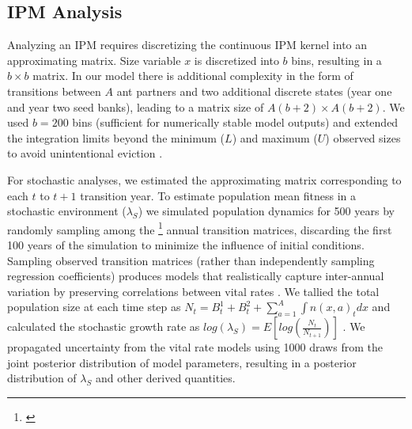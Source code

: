 \documentclass[11pt]{article}
\newcommand{\tom}[2]{{\color{red}{#1}}\footnote{\textit{\color{red}{#2}}}}
\begin{document}
\subsection*{IPM Analysis}
Analyzing an IPM requires discretizing the continuous IPM kernel into an approximating matrix. 
Size variable $x$ is discretized into $b$ bins, resulting in a $b \times b$ matrix.
In our model there is additional complexity in the form of transitions between $A$ ant partners and two additional discrete states (year one and year two seed banks), leading to a matrix size of $A(b+2) \times A(b+2)$.
We used $b = 200$ bins (sufficient for numerically stable model outputs) and extended the integration limits beyond the minimum ($L$) and maximum ($U$) observed sizes to avoid unintentional eviction \cite{Williams2012}. 

For stochastic analyses, we estimated the approximating matrix corresponding to each $t$ to $t+1$ transition year. 
To estimate population mean fitness in a stochastic environment ($\lambda_{S}$) we simulated population dynamics for 500 years by randomly sampling among the \tom{19}{Is this right? The number of transition matrices should be one fewer than then number of years, but I don't remember what happens with 2020.} annual transition matrices, discarding the first 100 years of the simulation to minimize the influence of initial conditions. 
Sampling observed transition matrices (rather than independently sampling regression coefficients) produces models that realistically capture inter-annual variation by preserving correlations between vital rates \cite{metcalf2015statistical}.
We tallied the total population size at each time step as  $N_{t} = B^1_{t} + B^2_{t} + \sum_{a=1}^{A}\int n(x,a)_{t}dx$ and calculated the stochastic growth rate as $log(\lambda_S) = E[log(\frac{N_{t}}{N_{t+1}})]$ \cite{rees2009integral}.
We propagated uncertainty from the vital rate models using 1000 draws from the joint posterior distribution of model parameters, resulting in a posterior distribution of $\lambda_{S}$ and other derived quantities.
\end{document}
